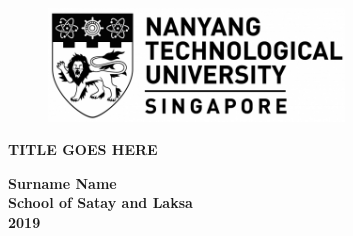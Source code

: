 \begin{center} 
    \vspace*{2cm}
    
 \begin{figure}[ht]
      \centering
      \includegraphics[width=0.7\textwidth]{img/NTUlogoblack.png}
  \end{figure}
  
  \vspace{4cm}
  
  \Large{\textbf{TITLE GOES HERE}}
  
  \vspace{6cm}
  
  \Large{\textbf{Surname Name}}\\
  \Large{\textbf{School of Satay and Laksa}}\\
  \Large{\textbf{2019}}
\end{center}